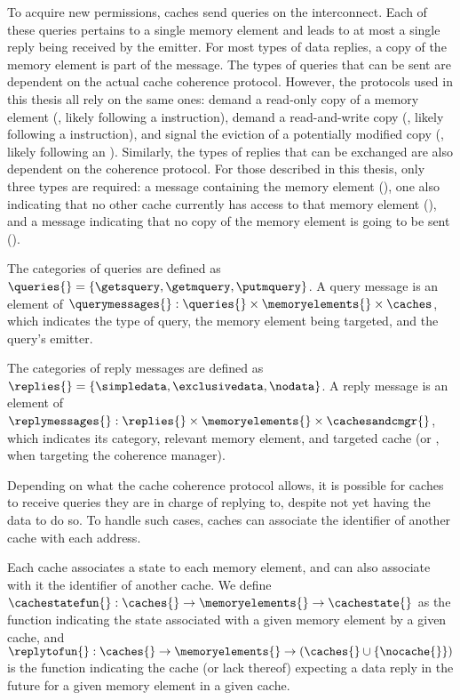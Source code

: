 To acquire new permissions, caches send queries on the interconnect. Each of
these queries pertains to a single memory element and leads to at most a single
reply being received by the emitter. For most types of data replies, a copy of
the memory element is part of the message. The types of queries that can be
sent are dependent on the actual cache coherence protocol. However, the
protocols used in this thesis all rely on the same ones: demand a read-only
copy of a memory element (\getsquery, likely following a \loadinstr{}
instruction), demand a read-and-write copy (\getmquery, likely following a
\storeinstr{} instruction), and signal the eviction of a potentially modified
copy (\putmquery, likely following an \evictinstr{}). Similarly, the
types of replies that can be exchanged are also dependent on the coherence
protocol. For those described in this thesis, only three types are required: a
message containing the memory element (\simpledata), one also indicating that
no other cache currently has access to that memory element (\exclusivedata),
and a message indicating that no copy of the memory element is going to be sent
(\nodata).

\begin{definition}[Query]
The categories of queries are defined as $\queries{} = \{\getsquery,
\getmquery, \putmquery\}$. A query message is an element of
$\querymessages{}: \queries{} \times \memoryelements{} \times \caches$, which
indicates the type of query, the memory element being targeted, and the
query's emitter.
\end{definition}

\begin{definition}[Reply]
The categories of reply messages are defined as $\replies{} = \{\simpledata,
\allowbreak{}
\exclusivedata,\allowbreak{} \nodata\}$. A reply message is an element of $\replymessages{}:
\replies{} \times \memoryelements{} \times \cachesandcmgr{}$, which indicates
its category, relevant memory element, and targeted cache (or \cmgr{}, when
targeting the coherence manager).
\end{definition}

Depending on what the cache coherence protocol allows, it is possible for
caches to receive queries they are in charge of replying to, despite not yet
having the data to do so. To handle such cases, caches can associate the
identifier of another cache with each address.

\begin{definition}
\label{fr:def:cache_info}
Each cache associates a state to each memory element, and can also associate
with it the identifier of another cache. We define $\cachestatefun{} :
\caches{} \to \memoryelements{} \to \cachestate{}$ as the function indicating
the state associated with a given memory element by a given cache, and
$\replytofun{} : \caches{} \to \memoryelements{} \to (\caches{} \cup
\{\nocache{}\})$ is the function indicating the cache (or lack thereof)
expecting a data reply in the future for a given memory element in a given
cache.
\end{definition}

